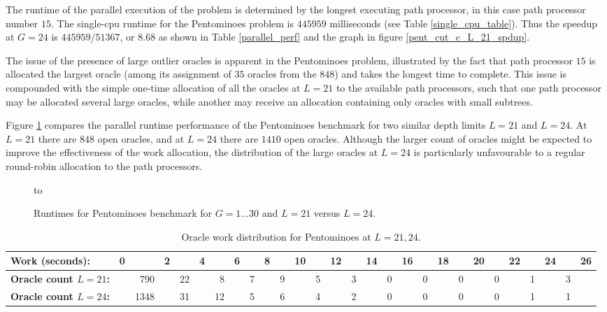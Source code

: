 The runtime of the parallel execution of the problem is determined by the longest
executing path processor, in this case path processor number $15$.  The single-cpu
runtime for the Pentominoes problem is $445959$ milliseconds (see Table
\ref{single_cpu_table}).  Thus the speedup at $G=24$ is $445959/51367$, or $8.68$ as
shown in Table \ref{parallel_perf} and the graph in figure
\ref{pent_cut_c_L_21_spdup}.

The issue of the presence of large outlier oracles is apparent in the
Pentominoes problem, illustrated by the fact that path processor $15$ is allocated the
largest oracle (among its assignment of $35$ oracles from the $848$) and takes the
longest time to complete.  This issue is compounded with the simple one-time allocation of 
all the oracles at $L=21$ to the available path processors, such that one path processor may
be allocated several large oracles, while another may receive an allocation containing only
oracles with small subtrees.

Figure \ref{pentbook_cut_c_L_24} compares the parallel runtime performance of the
Pentominoes benchmark for two similar depth limits $L=21$ and $L=24$.  At $L=21$ there
are $848$ open oracles, and at $L=24$ there are $1410$ open oracles.  Although the
larger count of oracles might be expected to improve the effectiveness of the work
allocation, the distribution of the large oracles at $L=24$ is particularly unfavourable
to a regular round-robin allocation to the path processors.

\begin{figure}[htb]
\vspace{5mm} \hbox to 
\caption{Runtimes for Pentominoes benchmark for $G=1\ldots 30$ and $L=21$ versus $L=24$.}
\vspace{5mm}
\label{pentbook_cut_c_L_24}
\end{figure}

\begin{table}[htb]
{\small
\begin{tabular}{| l | r @{} r @{} r @{} r @{} r @{} r @{} r @{} r @{} r @{} r @{} r @{}
   r @{} r @{} r @{} r @{} r @{} r @{} r @{} r @{} r @{} r @{} r @{} r @{} r @{} r @{}
   r @{} r |}
\hline
\textbf{Work (seconds):} & 0 & & 2 & & 4 & & 6 & & 8 &
 & 10 & & 12 & & 14 & & 16 & & 18 &
 & 20 & & 22 & & 24 &
 & 26 \\
\hline
\textbf{Oracle count $L=21$:} & & 790 & & 22 & & 8 & & 7 & & 9 & & 5 & & 3 & & 0 & &
 0 & & 0 & & 0 & & 1 & & 3 & \\
\hline
\textbf{Oracle count $L=24$:} & & 1348 & & 31 & & 12 & & 5 & & 6 & & 4 & & 2 & & 0 & &
 0 & & 0 & & 0 & & 1 & & 1 & \\
\hline
\end{tabular}
}
\caption{Oracle work distribution for Pentominoes at $L=21,24$.}
\label{pent24_orc_groups}
\end{table}

